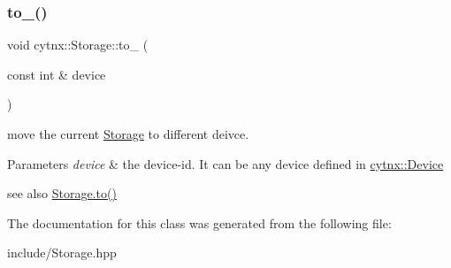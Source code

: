 \subsubsection{\texorpdfstring{to\+\_\+()}{to\_()}}
{\footnotesize\ttfamily void cytnx\+::\+Storage\+::to\+\_\+ (\begin{DoxyParamCaption}\item[{const int \&}]{device }\end{DoxyParamCaption})\hspace{0.3cm}{\ttfamily [inline]}}



move the current \hyperlink{classcytnx_1_1Storage}{Storage} to different deivce. 


\begin{DoxyParams}{Parameters}
{\em device} & the device-\/id. It can be any device defined in \hyperlink{}{cytnx\+::\+Device }\\
\hline
\end{DoxyParams}
see also \hyperlink{classcytnx_1_1Storage_a2abfcaacf807934be5dd21c254fdb30e}{Storage.\+to() } 

The documentation for this class was generated from the following file\+:\begin{DoxyCompactItemize}
\item 
include/Storage.\+hpp\end{DoxyCompactItemize}
